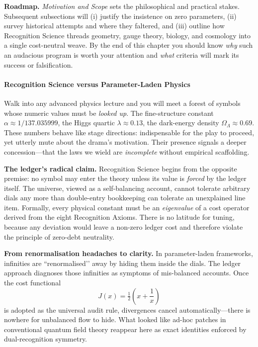 \documentclass[11pt,oneside]{book}
\begin{document}
\medskip
\noindent
\textbf{Roadmap.}  
\textit{Motivation and Scope} sets the philosophical and practical stakes.  Subsequent subsections will (i) justify the insistence on zero parameters, (ii) survey historical attempts and where they faltered, and (iii) outline how Recognition Science threads geometry, gauge theory, biology, and cosmology into a single cost-neutral weave.  By the end of this chapter you should know \emph{why} such an audacious program is worth your attention and \emph{what} criteria will mark its success or falsification.

\paragraph{Recognition Science versus Parameter-Laden Physics}
\label{ssec:zero-vs-dials}

\noindent
Walk into any advanced physics lecture and you will meet a forest of
symbols whose numeric values must be \emph{looked up}.  The fine-structure
constant \(\alpha\approx 1/137.035999\), the Higgs quartic
\(\lambda\approx 0.13\), the dark-energy density
\(\Omega_\Lambda\approx 0.69\).  These numbers behave like
stage directions: indispensable for the play to proceed, yet utterly
mute about the drama’s motivation.
Their presence signals a deeper concession—that the laws we wield are
\emph{incomplete} without empirical scaffolding.

\vspace{0.5\baselineskip}
\noindent\textbf{The ledger’s radical claim.}
Recognition Science begins from the opposite premise:
no symbol may enter the theory unless its value is \emph{forced} by the
ledger itself.  The universe, viewed as a self-balancing account, cannot
tolerate arbitrary dials any more than double-entry bookkeeping can tolerate
an unexplained line item.  Formally, every physical constant must be an
\emph{eigenvalue} of a cost operator derived from the eight Recognition
Axioms.
There is no latitude for tuning, because any deviation would leave
a non-zero ledger cost and therefore violate the principle of
zero-debt neutrality.

\vspace{0.5\baselineskip}
\noindent\textbf{From renormalisation headaches to clarity.}
In parameter-laden frameworks, infinities are “renormalised’’ away by
hiding them inside the dials.  The ledger approach diagnoses those
infinities as symptoms of mis-balanced accounts.
Once the cost functional
\[
  J(x)=\tfrac12\!\left(x + \frac1x\right)
\]
is adopted as the universal audit rule, divergences cancel
automatically—there is nowhere for unbalanced flow to hide.
What looked like ad-hoc patches in conventional
quantum field theory reappear here as exact identities enforced by
dual-recognition symmetry.
\end{document}
